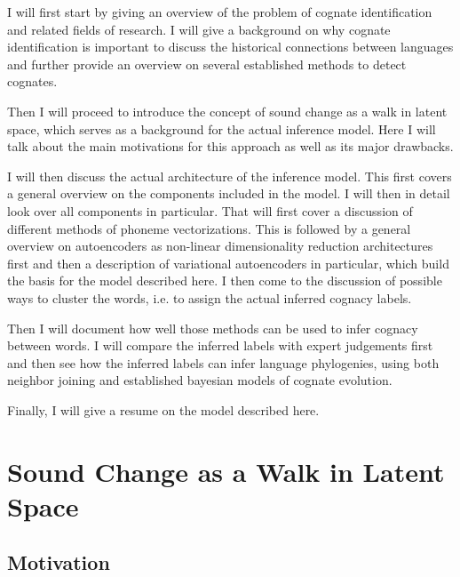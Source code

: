 \documentclass[6pt]{article}
\begin{document}
I will first start by giving an overview of the problem of cognate identification and related fields of research. I will give a background on why cognate identification is important to discuss the historical connections between languages and further provide an overview on several established methods to detect cognates.  

Then I will proceed to introduce the concept of sound change as a walk in latent space, which serves as a background for the actual inference model. Here I will talk about the main motivations for this approach as well as its major drawbacks. 


I will then discuss the actual architecture of the inference model. This first covers a general overview on the components included in the model. I will then in detail look over all components in particular. That will first cover a discussion of different methods of phoneme vectorizations. This is followed by a general overview on autoencoders as non-linear dimensionality reduction architectures first and then a description of variational autoencoders in particular, which build the basis for the model described here. I then come to the discussion of possible ways to cluster the words, i.e. to assign the actual inferred cognacy labels.

Then I will document how well those methods can be used to infer cognacy between words. I will compare the inferred labels with expert judgements first and then see how the inferred labels can infer language phylogenies, using both neighbor joining and established bayesian models of cognate evolution.

Finally, I will give a resume on the model described here.


\section{Sound Change as a Walk in Latent Space}
\label{Sound Change as a Walk in Latent Space}
\subsection{Motivation}
\end{document}
